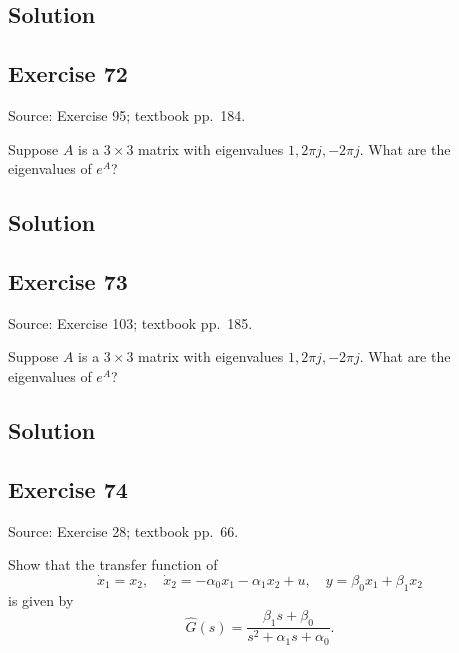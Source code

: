\documentclass[12pt,a4paper]{article}
\newlength{\questionroom}
\newenvironment{questionprompt}{%
  \begin{lrbox}{\questionbox}\begin{minipage}{\linewidth}%
}{%
  \end{minipage}\end{lrbox}%
  \setlength{\questionroom}{\dimexpr\ht\questionbox+\dp\questionbox+5.2cm\relax}%
  \ifdim\questionroom>\textheight\setlength{\questionroom}{\textheight}\fi
  \Needspace{\questionroom}%
  \noindent\usebox{\questionbox}\par
}
\begin{document}
\subsection*{Solution}
\vspace{3.5cm}


\begin{questionprompt}
\section*{Exercise 72}
\label{practice:72}
{\small Source: Exercise 95; textbook pp.~184.}\par
Suppose $A$ is a $3\times3$ matrix with eigenvalues $1,2\pi j,-2\pi j$. What are the eigenvalues of $e^A$?
\end{questionprompt}
\subsection*{Solution}
\vspace{3.5cm}


\begin{questionprompt}
\section*{Exercise 73}
\label{practice:73}
{\small Source: Exercise 103; textbook pp.~185.}\par
Suppose $A$ is a $3\times3$ matrix with eigenvalues $1,2\pi j,-2\pi j$. What are the eigenvalues of $e^A$?
\end{questionprompt}
\subsection*{Solution}
\vspace{3.5cm}


\begin{questionprompt}
\section*{Exercise 74}
\label{practice:74}
{\small Source: Exercise 28; textbook pp.~66.}\par
Show that the transfer function of
\[\dot x_1=x_2,\quad\dot x_2=-\alpha_0x_1-\alpha_1x_2+u,\quad y=\beta_0x_1+\beta_1x_2\]
is given by
\[\widehat G(s)=\frac{\beta_1s+\beta_0}{s^2+\alpha_1s+\alpha_0}.\]
\end{questionprompt}
\end{document}
